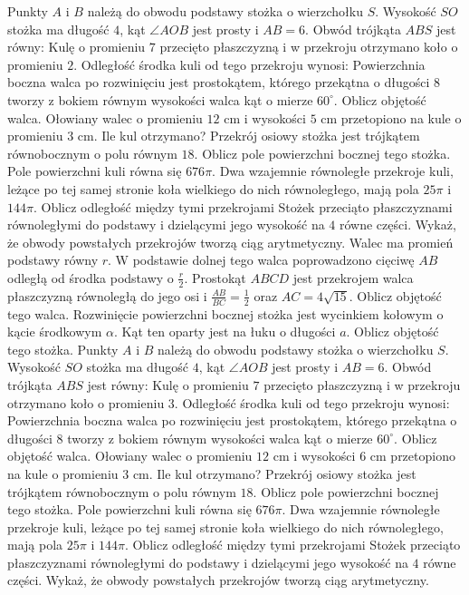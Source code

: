 Punkty $A$ i $B$ należą do obwodu podstawy stożka o wierzchołku $S$. Wysokość $SO$ stożka ma długość $4$, kąt $\angle AOB$ jest prosty i $AB=6$. Obwód trójkąta $ABS$ jest równy:
Kulę o promieniu $7$ przecięto płaszczyzną i w przekroju otrzymano koło o promieniu $2$. Odległość środka kuli od tego przekroju wynosi:
Powierzchnia boczna walca po rozwinięciu jest prostokątem, którego przekątna o długości $8$ tworzy z bokiem równym wysokości walca kąt o mierze $60^{\circ}$. Oblicz objętość walca.
Ołowiany walec o promieniu $12$ cm i wysokości $5$ cm przetopiono na kule o promieniu $3$ cm. Ile kul otrzymano?
Przekrój osiowy stożka jest trójkątem równobocznym o polu równym $18$. Oblicz pole powierzchni bocznej tego stożka.
Pole powierzchni kuli równa się $676\pi$. Dwa wzajemnie równoległe przekroje kuli, leżące po tej samej stronie koła wielkiego do nich równoległego, mają pola $25\pi$ i $144\pi$. Oblicz odległość między tymi przekrojami
Stożek przeciąto płaszczyznami równoległymi do podstawy i dzielącymi jego wysokość na $4$ równe części. Wykaż, że obwody powstałych przekrojów tworzą ciąg arytmetyczny.
Walec ma promień podstawy równy $r$. W podstawie dolnej tego walca poprowadzono cięciwę $AB$ odległą od środka podstawy o $\frac{r}{2}$. Prostokąt $ABCD$ jest przekrojem walca płaszczyzną równoległą do jego osi i $\frac{AB}{BC}=\frac{1}{2}$ oraz $AC=4\sqrt{15}$. Oblicz objętość tego walca.
Rozwinięcie powierzchni bocznej stożka jest wycinkiem kołowym o kącie środkowym $\alpha$. Kąt ten oparty jest na łuku o długości $a$. Oblicz objętość tego stożka.
Punkty $A$ i $B$ należą do obwodu podstawy stożka o wierzchołku $S$. Wysokość $SO$ stożka ma długość $4$, kąt $\angle AOB$ jest prosty i $AB=6$. Obwód trójkąta $ABS$ jest równy:
Kulę o promieniu $7$ przecięto płaszczyzną i w przekroju otrzymano koło o promieniu $3$. Odległość środka kuli od tego przekroju wynosi:
Powierzchnia boczna walca po rozwinięciu jest prostokątem, którego przekątna o długości $8$ tworzy z bokiem równym wysokości walca kąt o mierze $60^{\circ}$. Oblicz objętość walca.
Ołowiany walec o promieniu $12$ cm i wysokości $6$ cm przetopiono na kule o promieniu $3$ cm. Ile kul otrzymano?
Przekrój osiowy stożka jest trójkątem równobocznym o polu równym $18$. Oblicz pole powierzchni bocznej tego stożka.
Pole powierzchni kuli równa się $676\pi$. Dwa wzajemnie równoległe przekroje kuli, leżące po tej samej stronie koła wielkiego do nich równoległego, mają pola $25\pi$ i $144\pi$. Oblicz odległość między tymi przekrojami
Stożek przeciąto płaszczyznami równoległymi do podstawy i dzielącymi jego wysokość na $4$ równe części. Wykaż, że obwody powstałych przekrojów tworzą ciąg arytmetyczny.
